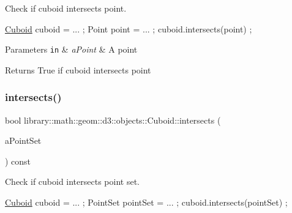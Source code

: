 Check if cuboid intersects point. 


\begin{DoxyCode}
\hyperlink{classlibrary_1_1math_1_1geom_1_1d3_1_1objects_1_1_cuboid_ac42299f962fab284a76a46d4ea4e6fa2}{Cuboid} cuboid = ... ;
Point point = ... ;
cuboid.intersects(point) ;
\end{DoxyCode}



\begin{DoxyParams}[1]{Parameters}
\mbox{\tt in}  & {\em a\+Point} & A point \\
\hline
\end{DoxyParams}
\begin{DoxyReturn}{Returns}
True if cuboid intersects point 
\end{DoxyReturn}
\mbox{\label{classlibrary_1_1math_1_1geom_1_1d3_1_1objects_1_1_cuboid_ac860b7abc830867b23019f37463334ac}} 
\subsubsection{\texorpdfstring{intersects()}{intersects()}\hspace{0.1cm}{\footnotesize\ttfamily [2/9]}}
{\footnotesize\ttfamily bool library\+::math\+::geom\+::d3\+::objects\+::\+Cuboid\+::intersects (\begin{DoxyParamCaption}\item[{const \hyperlink{classlibrary_1_1math_1_1geom_1_1d3_1_1objects_1_1_point_set}{Point\+Set} \&}]{a\+Point\+Set }\end{DoxyParamCaption}) const}



Check if cuboid intersects point set. 


\begin{DoxyCode}
\hyperlink{classlibrary_1_1math_1_1geom_1_1d3_1_1objects_1_1_cuboid_ac42299f962fab284a76a46d4ea4e6fa2}{Cuboid} cuboid = ... ;
PointSet pointSet = ... ;
cuboid.intersects(pointSet) ;
\end{DoxyCode}



